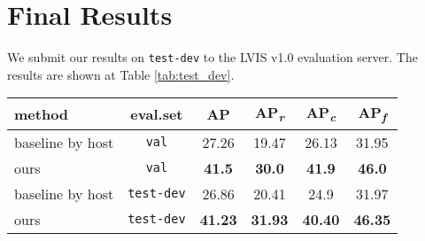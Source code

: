 \documentclass[runningheads]{llncs}
\begin{document}
\section{Final Results}

We submit our results on \texttt{test-dev} to the LVIS v1.0 evaluation server. The results are shown at Table \ref{tab:test_dev}.

 \begin{table*}
   \centering
   \setlength\tabcolsep{5pt}
   \begin{tabular}{l c | c c c c }
       method & eval.set & AP & AP\textsubscript{\textit{r}} & AP\textsubscript{\textit{c}} & AP\textsubscript{\textit{f}} \\
      \hline
       baseline by host & \texttt{val} & 27.26 & 19.47 & 26.13 & 31.95 \\
       ours & \texttt{val} & \textbf{41.5} & \textbf{30.0} & \textbf{41.9} & \textbf{46.0}  \\
       \hline
       baseline by host & \texttt{test-dev} & 26.86 & 20.41 & 24.9 & 31.97 \\
       ours & \texttt{test-dev} & \textbf{41.23} & \textbf{31.93} & \textbf{40.40} & \textbf{46.35} \\
   \end{tabular}
      \caption{Comparison of baselines provided by host with our method.
      }
   \label{tab:test_dev}
\end{table*}



\end{document}
